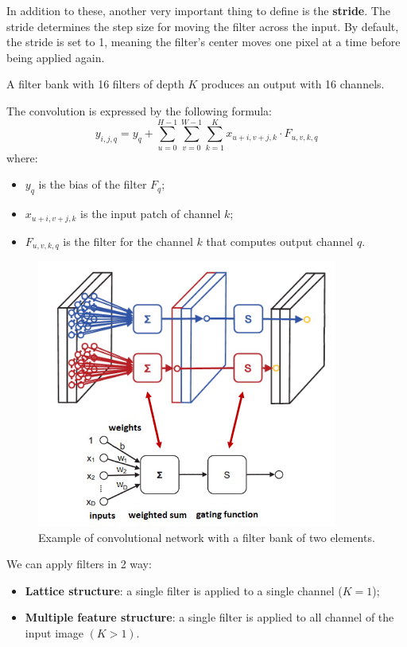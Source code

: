 In addition to these, another very important thing to define is the \textbf{stride}.
The stride determines the step size for moving the filter across the input. By
default, the stride is set to 1, meaning the filter's center moves one pixel at
a time before being applied again.

\begin{note}
    A filter bank with 16 filters of depth $K$ produces an output with 16 channels.
\end{note}

The convolution is expressed by the following formula:
\begin{equation}
    y_{i, j, q} = y_q + \sum_{u = 0}^{H - 1}\sum_{v = 0}^{W - 1}\sum_{k = 1}^{K} x_{u + i, v + j, k} \cdot F_{u, v, k, q}
\end{equation}
where:
\begin{itemize}
    \item $y_q$ is the bias of the filter $F_q$;
    \item $x_{u + i, v + j, k}$ is the input patch of channel $k$;
    \item $F_{u, v, k, q}$ is the filter for the channel $k$ that computes output
          channel $q$.
\end{itemize}

\begin{figure}[!ht]
    \centering
    \includegraphics[width=0.5\linewidth]{img/CNN/Conv2Filter.png}
    \caption{Example of convolutional network with a filter bank of two elements.}
    \label{fig:conv2filter}
\end{figure}

We can apply filters in 2 way:
\begin{itemize}
    \item \textbf{Lattice structure}: a single filter is applied to a single
          channel ($K = 1$);
    \item \textbf{Multiple feature structure}: a single filter is applied to all
          channel of the input image $(K > 1)$.
\end{itemize}


